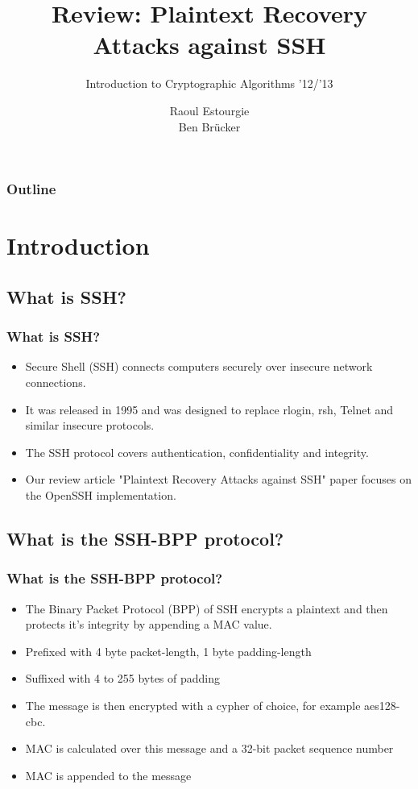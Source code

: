 \documentclass[fleqn]{beamer}
\title[Plaintext Recovery Attacks against SSH]{
Review: Plaintext Recovery Attacks against SSH}
\subtitle{Introduction to Cryptographic Algorithms '12/'13}
\author[Estourgie \& Br\"ucker]{
Raoul Estourgie\\
Ben Br\"ucker}
\institute[Radboud University Nijmegen]{
  Institute for Computing and Information Sciences \\
  Radboud University Nijmegen}
\date[Presentation 5-4-2013]
\begin{document}
  \begin{frame}
    \titlepage
  \end{frame}

  \begin{frame}
    \frametitle{Outline}
    \tableofcontents
  \end{frame}
  
\section{Introduction}

\subsection{What is SSH?}

  \begin{frame}
  \frametitle{What is SSH?}
    \begin{itemize}
      \item Secure Shell (SSH) connects computers securely over insecure network connections.
      \item It was released in 1995 and was designed to replace rlogin, rsh, Telnet and similar insecure protocols. 
      \item The SSH protocol covers authentication, confidentiality and integrity.
      \item Our review article "Plaintext Recovery Attacks against SSH" paper focuses on the OpenSSH implementation.
    \end{itemize}
  \end{frame}
  
\subsection{What is the SSH-BPP protocol?}

  \begin{frame}
  \frametitle{What is the SSH-BPP protocol?}
    \begin{itemize}
      \item The Binary Packet Protocol (BPP) of SSH encrypts a plaintext and then protects it's integrity by appending a MAC value.
      \item Prefixed with 4 byte packet-length, 1 byte padding-length
      \item Suffixed with 4 to 255 bytes of padding
      \item The message is then encrypted with a cypher of choice, for example aes128-cbc.
      \item MAC is calculated over this message and a 32-bit packet sequence number
      \item MAC is appended to the message
    \end{itemize}
  \end{frame}
    
\end{document}
